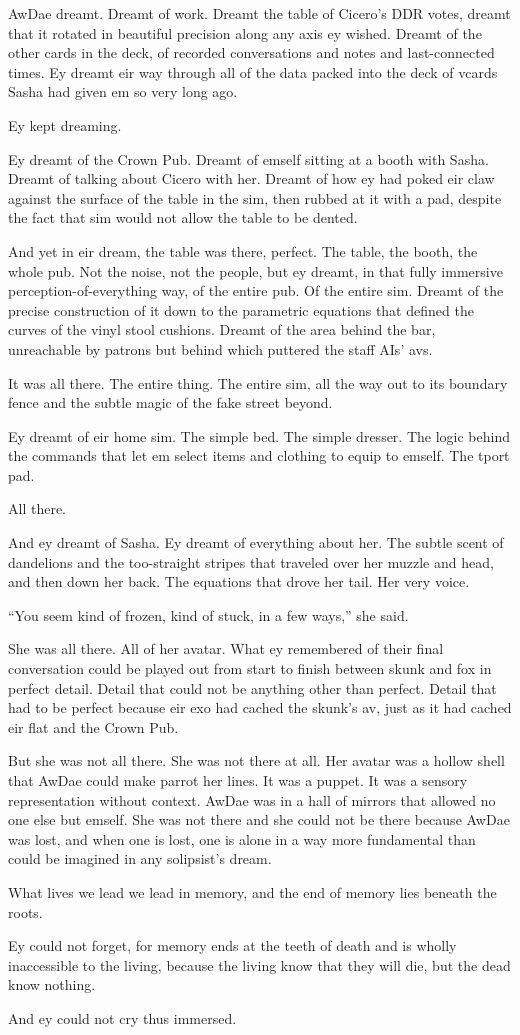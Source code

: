 AwDae dreamt. Dreamt of work. Dreamt the table of Cicero's DDR votes, dreamt that it rotated in beautiful precision along any axis ey wished. Dreamt of the other cards in the deck, of recorded conversations and notes and last-connected times. Ey dreamt eir way through all of the data packed into the deck of vcards Sasha had given em so very long ago.

Ey kept dreaming.

Ey dreamt of the Crown Pub. Dreamt of emself sitting at a booth with Sasha. Dreamt of talking about Cicero with her. Dreamt of how ey had poked eir claw against the surface of the table in the sim, then rubbed at it with a pad, despite the fact that sim would not allow the table to be dented.

And yet in eir dream, the table was there, perfect. The table, the booth, the whole pub. Not the noise, not the people, but ey dreamt, in that fully immersive perception-of-everything way, of the entire pub. Of the entire sim. Dreamt of the precise construction of it down to the parametric equations that defined the curves of the vinyl stool cushions. Dreamt of the area behind the bar, unreachable by patrons but behind which puttered the staff AIs' avs.

It was all there. The entire thing. The entire sim, all the way out to its boundary fence and the subtle magic of the fake street beyond.

Ey dreamt of eir home sim. The simple bed. The simple dresser. The logic behind the commands that let em select items and clothing to equip to emself. The tport pad.

All there.

And ey dreamt of Sasha. Ey dreamt of everything about her. The subtle scent of dandelions and the too-straight stripes that traveled over her muzzle and head, and then down her back. The equations that drove her tail. Her very voice.

``You seem kind of frozen, kind of stuck, in a few ways,'' she said.

She was all there. All of her avatar. What ey remembered of their final conversation could be played out from start to finish between skunk and fox in perfect detail. Detail that could not be anything other than perfect. Detail that had to be perfect because eir exo had cached the skunk's av, just as it had cached eir flat and the Crown Pub.

But she was not all there. She was not there at all. Her avatar was a hollow shell that AwDae could make parrot her lines. It was a puppet. It was a sensory representation without context. AwDae was in a hall of mirrors that allowed no one else but emself. She was not there and she could not be there because AwDae was lost, and when one is lost, one is alone in a way more fundamental than could be imagined in any solipsist's dream.

What lives we lead we lead in memory, and the end of memory lies beneath the roots.

Ey could not forget, for memory ends at the teeth of death and is wholly inaccessible to the living, because the living know that they will die, but the dead know nothing.

And ey could not cry thus immersed.
